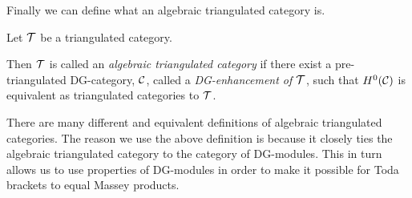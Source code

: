 Finally we can define what an algebraic triangulated category is.
\begin{definition}
    Let \( {\mathcal{T}} \) be a triangulated category.

    Then \( {\mathcal{T}} \) is called an \emph{algebraic triangulated category} if there exist a pre-triangulated DG-category, \( {\mathcal{C}} \), called a \emph{DG-enhancement of \( {\mathcal{T}} \)}, such that \( H^0({\mathcal{C}}) \) is equivalent as triangulated categories to \( {\mathcal{T}} \).
\end{definition}

There are many different and equivalent definitions of algebraic triangulated categories. The reason we use the above definition is because it closely ties the algebraic triangulated category to the category of DG-modules. This in turn allows us to use properties of DG-modules in order to make it possible for Toda brackets to equal Massey products.

